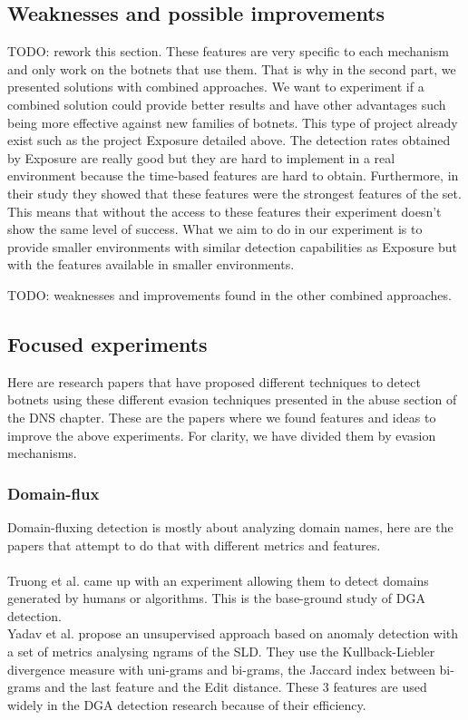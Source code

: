 \subsection{Weaknesses and possible improvements}
TODO: rework this section.
These features are very specific to each mechanism and only work on the botnets that use them. That is why in the second part, we presented solutions with combined approaches. We want to experiment if a combined solution could provide better results and have other advantages such being more effective against new families of botnets. 
This type of project already exist such as the project Exposure detailed above. The detection rates obtained by Exposure are really good but they are hard to implement in a real environment because the time-based features are hard to obtain. Furthermore, in their study they showed that these features were the strongest features of the set. This means that without the access to these features their experiment doesn't show the same level of success. What we aim to do in our experiment is to provide smaller environments with similar detection capabilities as Exposure but with the features available in smaller environments. 

TODO: weaknesses and improvements found in the other combined approaches.
\subsection{Focused experiments}
Here are research papers that have proposed different techniques to detect botnets using these different evasion techniques presented in the abuse section of the DNS chapter. These are the papers where we found features and ideas to improve the above experiments. For clarity, we have divided them by evasion mechanisms.
\subsubsection{Domain-flux}
Domain-fluxing detection is mostly about analyzing domain names, here are the papers that attempt to do that with different metrics and features.\\
\\
Truong et al. \cite{dns-traffic} came up with an experiment allowing them to detect domains generated by humans or algorithms. This is the base-ground study of DGA detection.\\

Yadav et al. \cite{dga2} propose an unsupervised approach based on anomaly detection with a set of metrics analysing ngrams of the SLD. They use the Kullback-Liebler divergence measure with uni-grams and bi-grams, the Jaccard index between bi-grams and the last feature and the Edit distance. These 3 features are used widely in the DGA detection research because of their efficiency.\\

